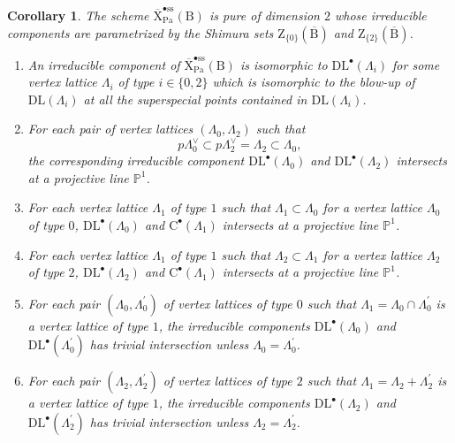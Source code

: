\documentclass[10pt]{amsart}
\numberwithin{equation}{section}
\newtheorem{corollary}[equation]{Corollary}
\theoremstyle{definition}
\def\Pa{\mathrm{Pa}}
\def\PP{\mathbb{P}}
\def\rmB{\mathrm{B}}
\def\rmC{\mathrm{C}}
\def\rmX{\mathrm{X}}
\def\rmZ{\mathrm{Z}}
\begin{document}
\begin{corollary}\label{ss-bullet}
The scheme $\overline{\rmX}^{\bullet\mathrm{ss}}_{\Pa}(\rmB)$ is pure of dimension $2$ whose irreducible components are parametrized by 
the Shimura sets $\rmZ_{\{0\}}(\overline{\rmB})$ and $\rmZ_{\{2\}}(\overline{\rmB})$. 
\begin{enumerate}

\item An irreducible component of $\overline{\rmX}^{\bullet\mathrm{ss}}_{\Pa}(\rmB)$ is isomorphic to $\mathrm{DL}^{\bullet}(\Lambda_{i})$ for some vertex lattice $\Lambda_{i}$ of type $i\in\{0,2\}$ which is isomorphic to the blow-up of $\mathrm{DL}(\Lambda_{i})$ at all the superspecial points contained in $\mathrm{DL}(\Lambda_{i})$.

\item For each pair of vertex lattices $(\Lambda_{0}, \Lambda_{2})$ such that
\begin{equation*}
p\Lambda^{\vee}_{0}\subset p\Lambda^{\vee}_{2}=\Lambda_{2}\subset \Lambda_{0}, 
\end{equation*}
the corresponding irreducible component $\mathrm{DL}^{\bullet}(\Lambda_{0})$ and $\mathrm{DL}^{\bullet}(\Lambda_{2})$ intersects at a projective line $\PP^{1}$.

\item For each vertex lattice $\Lambda_{1}$ of type $1$ such that $\Lambda_{1}\subset \Lambda_{0}$ for a vertex lattice $\Lambda_{0}$ of type $0$, $\mathrm{DL}^{\bullet}(\Lambda_{0})$ and  $\rmC^{\bullet}(\Lambda_{1})$ intersects at a projective line $\PP^{1}$.

\item For each vertex lattice $\Lambda_{1}$ of type $1$ such that $\Lambda_{2}\subset \Lambda_{1}$ for a vertex lattice $\Lambda_{2}$ of type $2$, $\mathrm{DL}^{\bullet}(\Lambda_{2})$ and $\rmC^{\bullet}(\Lambda_{1})$ intersects at a projective line $\PP^{1}$.

\item For each pair $(\Lambda_{0}, \Lambda^{\prime}_{0})$ of vertex lattices of type $0$ such that $\Lambda_{1}=\Lambda_{0}\cap\Lambda^{\prime}_{0}$ is a vertex lattice of type $1$, the irreducible components $\mathrm{DL}^{\bullet}(\Lambda_{0})$ and $\mathrm{DL}^{\bullet}(\Lambda^{\prime}_{0})$ has trivial intersection unless $\Lambda_{0}=\Lambda^{\prime}_{0}$.

\item For each pair $(\Lambda_{2}, \Lambda^{\prime}_{2})$ of vertex lattices of type $2$ such that $\Lambda_{1}=\Lambda_{2}+\Lambda^{\prime}_{2}$ is a vertex lattice of type $1$, the irreducible components $\mathrm{DL}^{\bullet}(\Lambda_{2})$ and $\mathrm{DL}^{\bullet}(\Lambda^{\prime}_{2})$ has trivial intersection unless $\Lambda_{2}=\Lambda^{\prime}_{2}$.
\end{enumerate}
\end{corollary}
\end{document}

